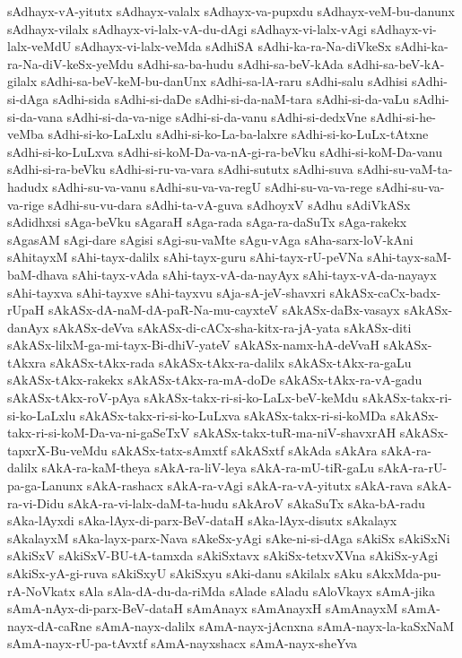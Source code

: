{sAdhayx-vA-yitutx
sAdhayx-valalx
sAdhayx-va-pupxdu
sAdhayx-veM-bu-danunx
sAdhayx-vilalx
sAdhayx-vi-lalx-vA-du-dAgi
sAdhayx-vi-lalx-vAgi
sAdhayx-vi-lalx-veMdU
sAdhayx-vi-lalx-veMda
sAdhiSA
sAdhi-ka-ra-Na-diVkeSx
sAdhi-ka-ra-Na-diV-keSx-yeMdu
sAdhi-sa-ba-hudu
sAdhi-sa-beV-kAda
sAdhi-sa-beV-kA-gilalx
sAdhi-sa-beV-keM-bu-danUnx
sAdhi-sa-lA-raru
sAdhi-salu
sAdhisi
sAdhi-si-dAga
sAdhi-sida
sAdhi-si-daDe
sAdhi-si-da-naM-tara
sAdhi-si-da-vaLu
sAdhi-si-da-vana
sAdhi-si-da-va-nige
sAdhi-si-da-vanu
sAdhi-si-dedxVne
sAdhi-si-he-veMba
sAdhi-si-ko-LaLxlu
sAdhi-si-ko-La-ba-lalxre
sAdhi-si-ko-LuLx-tAtxne
sAdhi-si-ko-LuLxva
sAdhi-si-koM-Da-va-nA-gi-ra-beVku
sAdhi-si-koM-Da-vanu
sAdhi-si-ra-beVku
sAdhi-si-ru-va-vara
sAdhi-sututx
sAdhi-suva
sAdhi-su-vaM-ta-hadudx
sAdhi-su-va-vanu
sAdhi-su-va-va-regU
sAdhi-su-va-va-rege
sAdhi-su-va-va-rige
sAdhi-su-vu-dara
sAdhi-ta-vA-guva
sAdhoyxV
sAdhu
sAdiVkASx
sAdidhxsi
sAga-beVku
sAgaraH
sAga-rada
sAga-ra-daSuTx
sAga-rakekx
sAgasAM
sAgi-dare
sAgisi
sAgi-su-vaMte
sAgu-vAga
sAha-sarx-loV-kAni
sAhitayxM
sAhi-tayx-dalilx
sAhi-tayx-guru
sAhi-tayx-rU-peVNa
sAhi-tayx-saM-baM-dhava
sAhi-tayx-vAda
sAhi-tayx-vA-da-nayAyx
sAhi-tayx-vA-da-nayayx
sAhi-tayxva
sAhi-tayxve
sAhi-tayxvu
sAja-sA-jeV-shavxri
sAkASx-caCx-badx-rUpaH
sAkASx-dA-naM-dA-paR-Na-mu-cayxteV
sAkASx-daBx-vasayx
sAkASx-danAyx
sAkASx-deVva
sAkASx-di-cACx-sha-kitx-ra-jA-yata
sAkASx-diti
sAkASx-lilxM-ga-mi-tayx-Bi-dhiV-yateV
sAkASx-namx-hA-deVvaH
sAkASx-tAkxra
sAkASx-tAkx-rada
sAkASx-tAkx-ra-dalilx
sAkASx-tAkx-ra-gaLu
sAkASx-tAkx-rakekx
sAkASx-tAkx-ra-mA-doDe
sAkASx-tAkx-ra-vA-gadu
sAkASx-tAkx-roV-pAya
sAkASx-takx-ri-si-ko-LaLx-beV-keMdu
sAkASx-takx-ri-si-ko-LaLxlu
sAkASx-takx-ri-si-ko-LuLxva
sAkASx-takx-ri-si-koMDa
sAkASx-takx-ri-si-koM-Da-va-ni-gaSeTxV
sAkASx-takx-tuR-ma-niV-shavxrAH
sAkASx-tapxrX-Bu-veMdu
sAkASx-tatx-sAmxtf
sAkASxtf
sAkAda
sAkAra
sAkA-ra-dalilx
sAkA-ra-kaM-theya
sAkA-ra-liV-leya
sAkA-ra-mU-tiR-gaLu
sAkA-ra-rU-pa-ga-Lanunx
sAkA-rashacx
sAkA-ra-vAgi
sAkA-ra-vA-yitutx
sAkA-rava
sAkA-ra-vi-Didu
sAkA-ra-vi-lalx-daM-ta-hudu
sAkAroV
sAkaSuTx
sAka-bA-radu
sAka-lAyxdi
sAka-lAyx-di-parx-BeV-dataH
sAka-lAyx-disutx
sAkalayx
sAkalayxM
sAka-layx-parx-Nava
sAkeSx-yAgi
sAke-ni-si-dAga
sAkiSx
sAkiSxNi
sAkiSxV
sAkiSxV-BU-tA-tamxda
sAkiSxtavx
sAkiSx-tetxvXVna
sAkiSx-yAgi
sAkiSx-yA-gi-ruva
sAkiSxyU
sAkiSxyu
sAki-danu
sAkilalx
sAku
sAkxMda-pu-rA-NoVkatx
sAla
sAla-dA-du-da-riMda
sAlade
sAladu
sAloVkayx
sAmA-jika
sAmA-nAyx-di-parx-BeV-dataH
sAmAnayx
sAmAnayxH
sAmAnayxM
sAmA-nayx-dA-caRne
sAmA-nayx-dalilx
sAmA-nayx-jAcnxna
sAmA-nayx-la-kaSxNaM
sAmA-nayx-rU-pa-tAvxtf
sAmA-nayxshacx
sAmA-nayx-sheYva
}
